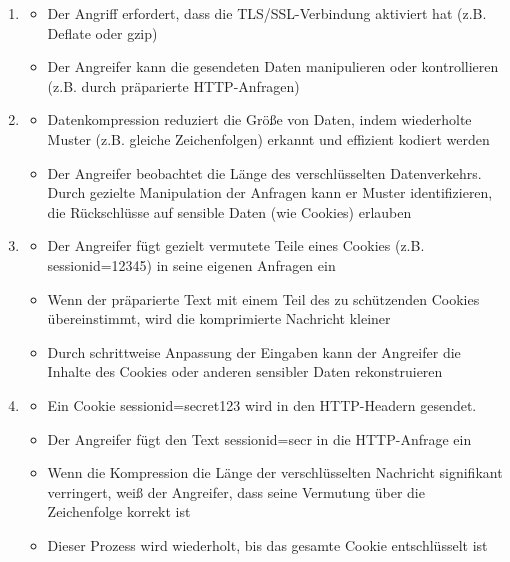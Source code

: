 \begin{infoBox}[title=Wie funktioniert der CRIME-Angriff?]
    \begin{enumerate}
        \item {}
        \begin{itemize}
            \item Der Angriff erfordert, dass die TLS/SSL-Verbindung  aktiviert hat (z.B. Deflate oder gzip)
            \item Der Angreifer kann die gesendeten Daten manipulieren oder kontrollieren (z.B. durch präparierte HTTP-Anfragen)
        \end{itemize}
        \item {}
        \begin{itemize}
            \item Datenkompression reduziert die Größe von Daten, indem wiederholte Muster (z.B. gleiche Zeichenfolgen) erkannt und effizient kodiert werden
            \item Der Angreifer beobachtet die Länge des verschlüsselten Datenverkehrs. Durch gezielte Manipulation der Anfragen kann er Muster identifizieren, die Rückschlüsse auf sensible Daten (wie Cookies) erlauben
        \end{itemize}
        \item {}
        \begin{itemize}
            \item Der Angreifer fügt gezielt vermutete Teile eines Cookies (z.B. sessionid=12345) in seine eigenen Anfragen ein
            \item Wenn der präparierte Text mit einem Teil des zu schützenden Cookies übereinstimmt, wird die komprimierte Nachricht kleiner
            \item Durch schrittweise Anpassung der Eingaben kann der Angreifer die Inhalte des Cookies oder anderen sensibler Daten rekonstruieren
        \end{itemize}
        \item {}
        \begin{itemize}
            \item Ein Cookie sessionid=secret123 wird in den HTTP-Headern gesendet.
            \item Der Angreifer fügt den Text sessionid=secr in die HTTP-Anfrage ein
            \item Wenn die Kompression die Länge der verschlüsselten Nachricht signifikant verringert, weiß der Angreifer, dass seine Vermutung über die Zeichenfolge korrekt ist
            \item Dieser Prozess wird wiederholt, bis das gesamte Cookie entschlüsselt ist
        \end{itemize}
    \end{enumerate}
\end{infoBox}
\clearpage
